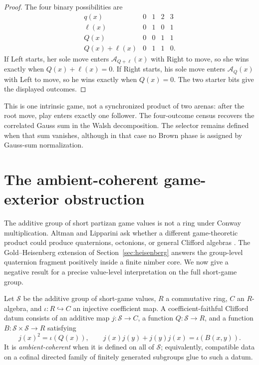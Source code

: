 \documentclass[11pt]{article}
\theoremstyle{definition}
\theoremstyle{remark}
\begin{document}
\begin{proof}
The four binary possibilities are
\[
\begin{array}{c|cccc}
q(x)&0&1&2&3\\ \hline
\ell(x)&0&1&0&1\\
Q(x)&0&0&1&1\\
Q(x)+\ell(x)&0&1&1&0.
\end{array}
\]
If Left starts, her sole move enters $\mathcal A_{Q+\ell}(x)$ with Right to
move, so she wins exactly when $Q(x)+\ell(x)=0$.  If Right starts, his sole
move enters $\mathcal A_Q(x)$ with Left to move, so he wins exactly when
$Q(x)=0$.  The two starter bits give the displayed outcomes.
\end{proof}

This is one intrinsic game, not a synchronized product of two arenas: after
the root move, play enters exactly one follower.  The four-outcome census
recovers the correlated Gauss sum in the Walsh decomposition.  The selector remains
defined when that sum vanishes, although in that case no Brown phase is
assigned by Gauss-sum normalization.

\section{The ambient-coherent game-exterior obstruction}\label{sec:exterior}

The additive group of short partizan game values is not a ring under Conway
multiplication.  Altman and Lipparini ask whether a different game-theoretic
product could produce quaternions, octonions, or general Clifford algebras
\cite[Problem 5.3(j)]{altmanlipparini2026}.  The Gold--Heisenberg extension
of Section~\ref{sec:heisenberg} answers the group-level quaternion fragment
positively inside a finite nimber core.  We now give a negative result for a
precise value-level interpretation on the full short-game group.

Let $\mathcal S$ be the additive group of short-game values, $R$ a commutative
ring, $C$ an $R$-algebra, and $\iota:R\hookrightarrow C$ an injective
coefficient map.  A coefficient-faithful Clifford datum consists of an
additive map $j:\mathcal S\to C$, a function $Q:\mathcal S\to R$, and a
function $B:\mathcal S\times\mathcal S\to R$ satisfying
\[
 j(x)^2=\iota(Q(x)),
 \qquad
 j(x)j(y)+j(y)j(x)=\iota(B(x,y)).
\]
It is \emph{ambient-coherent} when it is defined on all of $\mathcal S$;
equivalently, compatible data on a cofinal directed family of finitely
generated subgroups glue to such a datum.
\end{document}
